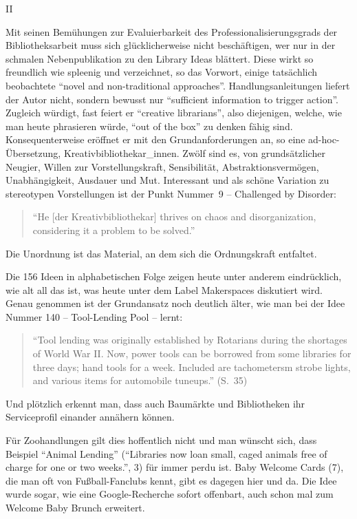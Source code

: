 \documentclass[a4paper,
fontsize=11pt,
oneside,
numbers=noperiodatend,
parskip=half-,
bibliography=totoc,
final
]{scrartcl}
\begin{document}
II

Mit seinen Bemühungen zur Evaluierbarkeit des Professionalisierungsgrads
der Bibliotheksarbeit muss sich glücklicherweise nicht beschäftigen, wer
nur in der schmalen Nebenpublikation zu den Library Ideas blättert.
Diese wirkt so freundlich wie spleenig und verzeichnet, so das Vorwort,
einige tatsächlich beobachtete \enquote{novel and non-traditional
approaches}. Handlungsanleitungen liefert der Autor nicht, sondern
bewusst nur \enquote{sufficient information to trigger action}. Zugleich
würdigt, fast feiert er \enquote{creative librarians}, also diejenigen,
welche, wie man heute phrasieren würde, \enquote{out of the box} zu
denken fähig sind. Konsequenterweise eröffnet er mit den
Grundanforderungen an, so eine ad-hoc-Übersetzung,
Kreativbibliothekar\_innen. Zwölf sind es, von grundsätzlicher Neugier,
Willen zur Vorstellungskraft, Sensibilität, Abstraktionsvermögen,
Unabhängigkeit, Ausdauer und Mut. Interessant und als schöne Variation
zu stereotypen Vorstellungen ist der Punkt Nummer~9 -- Challenged by
Disorder:

\begin{quote}
\enquote{He {[}der Kreativbibliothekar{]} thrives on chaos and
disorganization, considering it a problem to be solved.}
\end{quote}

Die Unordnung ist das Material, an dem sich die Ordnungskraft entfaltet.

Die 156 Ideen in alphabetischen Folge zeigen heute unter anderem
eindrücklich, wie alt all das ist, was heute unter dem Label Makerspaces
diskutiert wird. Genau genommen ist der Grundansatz noch deutlich älter,
wie man bei der Idee Nummer 140 -- Tool-Lending Pool -- lernt:

\begin{quote}
\enquote{Tool lending was originally established by Rotarians during the
shortages of World War II. Now, power tools can be borrowed from some
libraries for three days; hand tools for a week. Included are
tachometersm strobe lights, and various items for automobile tuneups.}
(S.~35)
\end{quote}

Und plötzlich erkennt man, dass auch Baumärkte und Bibliotheken ihr
Serviceprofil einander annähern können.

Für Zoohandlungen gilt dies hoffentlich nicht und man wünscht sich, dass
Beispiel \enquote{Animal Lending} (\enquote{Libraries now loan small,
caged animals free of charge for one or two weeks.}, 3) für immer perdu
ist. Baby Welcome Cards (7), die man oft von Fußball-Fanclubs kennt,
gibt es dagegen hier und da. Die Idee wurde sogar, wie eine
Google-Recherche sofort offenbart, auch schon mal zum Welcome Baby
Brunch erweitert.
\end{document}
